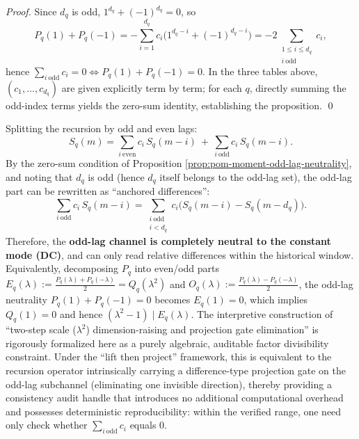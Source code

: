 \begin{proof}
Since \(d_q\) is odd, \(1^{d_q}+(-1)^{d_q}=0\), so
\[
P_q(1)+P_q(-1)
= -\sum_{i=1}^{d_q} c_i\bigl(1^{d_q-i}+(-1)^{d_q-i}\bigr)
= -2\sum_{\substack{1\le i\le d_q\\ i\ \mathrm{odd}}}c_i,
\]
hence \(\sum_{i\ \mathrm{odd}}c_i=0\iff P_q(1)+P_q(-1)=0\).
In the three tables above, \((c_1,\dots,c_{d_q})\) are given explicitly term by term; for each \(q\), directly summing the odd-index terms yields the zero-sum identity, establishing the proposition. \qed
\end{proof}

\begin{remark}\label{rem:pom-moment-odd-lag-neutrality-gate}
Splitting the recursion by odd and even lags:
\[
S_q(m)=\sum_{i\ \mathrm{even}}c_i\,S_q(m-i)\ +\ \sum_{i\ \mathrm{odd}}c_i\,S_q(m-i).
\]
By the zero-sum condition of Proposition \ref{prop:pom-moment-odd-lag-neutrality}, and noting that \(d_q\) is odd (hence \(d_q\) itself belongs to the odd-lag set), the odd-lag part can be rewritten as ``anchored differences'':
\[
\sum_{i\ \mathrm{odd}}c_i\,S_q(m-i)
=\sum_{\substack{i\ \mathrm{odd}\\ i<d_q}}c_i\bigl(S_q(m-i)-S_q(m-d_q)\bigr).
\]
Therefore, the \textbf{odd-lag channel is completely neutral to the constant mode (DC)}, and can only read relative differences within the historical window.
Equivalently, decomposing \(P_q\) into even/odd parts
\(
E_q(\lambda):=\frac{P_q(\lambda)+P_q(-\lambda)}{2}=Q_q(\lambda^2)
\)
and
\(
O_q(\lambda):=\frac{P_q(\lambda)-P_q(-\lambda)}{2}
\),
the odd-lag neutrality \(P_q(1)+P_q(-1)=0\) becomes \(E_q(1)=0\), which implies \(Q_q(1)=0\) and hence \((\lambda^2-1)\mid E_q(\lambda)\).
The interpretive construction of ``two-step scale (\(\lambda^2\)) dimension-raising and projection gate elimination'' is rigorously formalized here as a purely algebraic, auditable factor divisibility constraint.
Under the ``lift then project'' framework, this is equivalent to the recursion operator intrinsically carrying a difference-type projection gate on the odd-lag subchannel (eliminating one invisible direction), thereby providing a consistency audit handle that introduces no additional computational overhead and possesses deterministic reproducibility: within the verified range, one need only check whether \(\sum_{i\ \mathrm{odd}}c_i\) equals \(0\).
\end{remark}

